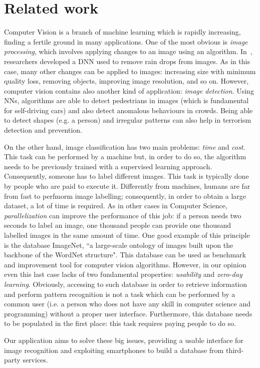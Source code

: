 \section{Related work}
\label{sec:related}

Computer Vision is a branch of machine learning which is rapidly increasing, 
finding a fertile ground in many applications. One of the most obvious is 
\textit{image processing}, which involves applying changes to an image using an 
algorithm. In~\cite{Rain}, researchers developed a DNN used to remove rain drops 
from images. As in this case, many other changes can be applied to images: 
increasing size with minimum quality loss, removing objects, improving image 
resolution, and so on. However, computer vision contains also another kind of 
application: \textit{image detection}. Using NNs, algorithms are able to detect 
pedestrians in images\cite{Pedestrian} (which is fundamental for self-driving 
cars) and also detect anomalous behaviours in crowds\cite{Crowd}. Being able to 
detect shapes (e.g. a person) and irregular patterns can also help in terrorism 
detection and prevention.

On the other hand, image classification has two main problems: \textit{time} and 
\textit{cost}. This task can be performed by a machine but, in order to do so, 
the algorithm needs to be previously trained with a supervised learning 
approach. Consequently, someone has to label different images. This task is typically 
done by people who are paid to execute it. Differently from machines, humans are 
far from fast to perfmorm image labelling; consequently, in order to obtain a large 
dataset, a lot of time is required.
As in other cases in Computer Science, \textit{parallelization} can improve the 
performance of this job: if a person needs two seconds to label an image, one 
thousand people can provide one thousand labelled images in the same amount of 
time. One good example of this principle is the database 
ImageNet\cite{ImageNet2}, ``a large-scale ontology of images built upon the 
backbone of the WordNet structure"\cite{ImageNet1}. This database can be used as 
benchmark and improvement tool for computer vision algorithms.
However, in our opinion even this last case lacks of two fundamental 
properties: \textit{usability} and \textit{zero-day learning}. Obviously, 
accessing to such database in order to retrieve information and perform pattern 
recognition is not a task which can be performed by a common user (i.e. a person 
who does not have any skill in computer science and programming) without a proper user 
interface. Furthermore, this database needs to be populated in the first place: 
this task requires paying people to do so.

Our application aims to solve these big issues, providing a usable interface for 
image recognition and exploiting smartphones to build a database from third-party 
services.
